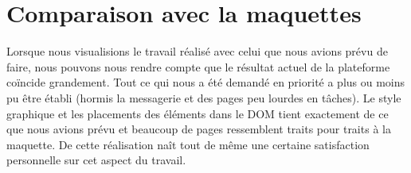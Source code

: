 \section{Comparaison avec la maquettes}

Lorsque nous visualisions le travail réalisé avec celui que nous avions prévu de faire, nous pouvons nous rendre compte que le résultat actuel de la plateforme coïncide grandement. Tout ce qui nous a été demandé en priorité a plus ou moins pu être établi (hormis la messagerie et des pages peu lourdes en tâches). Le style graphique et les placements des éléments dans le DOM tient exactement de ce que nous avions prévu et beaucoup de pages ressemblent traits pour traits à la maquette. De cette réalisation naît tout de même une certaine satisfaction personnelle sur cet aspect du travail.
